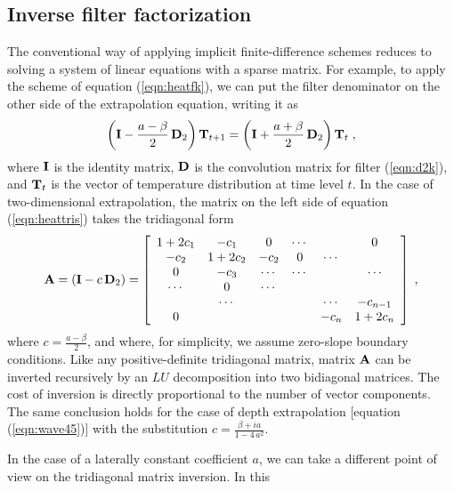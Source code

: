 \subsection{Inverse filter factorization}
The conventional way of applying implicit finite-difference schemes
reduces to solving a system of linear equations with a sparse matrix.
For example, to apply the scheme of equation (\ref{eqn:heatfk}), we
can put the filter denominator on the other side of the extrapolation
equation, writing it as
\begin{equation}
  \label{eqn:heattris}
  \left(\bold{I} - \frac{a-\beta}{2}\,\bold{D}_2\right) \bold{T}_{t+1} =
  \left(\bold{I} + \frac{a+\beta}{2}\,\bold{D}_2\right) \bold{T}_t\;,
\end{equation}
where $\bold{I}$ is the identity matrix, $\bold{D}$ is the convolution
matrix for filter (\ref{eqn:d2k}), and $\bold{T}_t$ is the vector of
temperature distribution at time level $t$. In the case of
two-dimensional extrapolation, the matrix on the left side of equation
(\ref{eqn:heattris}) takes the tridiagonal form
\begin{equation}\label{eqn:matrix}
  \bold{A} = \left(\bold{I} -c\,\bold{D}_2\right) =
  \left[\begin{array}{cccccc}
  1+2 c_{1}   & -c_{1}     &  0     & \cdots &        & 0      \\
  -c_{2}     & 1+2c_{2}   & -c_{2}     & 0      & \cdots &        \\
  0      & -c_{3}     & \cdots & \cdots &        & \cdots \\
  \cdots & 0      & \cdots &        &        &        \\
         & \cdots &        &        & \cdots & -c_{n-1}     \\
  0      &        &        &        & -c_{n}     & 1 + 2c_{n}
  \end{array}\right]\;,
\end{equation}
where $c = \frac{a-\beta}{2}$, and where, for simplicity, we assume
zero-slope boundary conditions. Like any positive-definite tridiagonal
matrix, matrix $\bold{A}$ can be inverted recursively by an $LU$
decomposition into two bidiagonal matrices. The cost of inversion is
directly proportional to the number of vector components.  The same
conclusion holds for the case of depth extrapolation [equation
(\ref{eqn:wave45})] with the substitution $c = \frac{\beta + i
  a}{1-4\,a^2}$.
\par
In the case of a laterally constant coefficient $a$, we can take a
different point of view on the tridiagonal matrix inversion. In this
